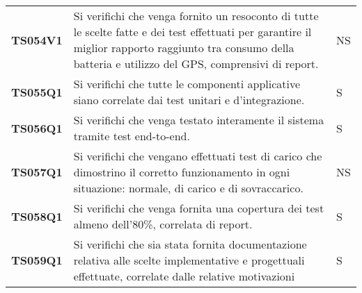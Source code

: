 \documentclass[../../piano-di-qualifica.tex]{subfiles}
\begin{document}
\begin{longtable}[H]{>{\centering\bfseries}m{3cm} >{}m{10cm} >{\centering\arraybackslash}m{3cm}}
  TS054V1            & Si verifichi che venga fornito un resoconto di tutte le scelte fatte e dei test effettuati per garantire il miglior rapporto raggiunto tra consumo della batteria e utilizzo del GPS, comprensivi di report.
                     & NS                                                                                                                                                                                                                                                  \\

  TS055Q1            & Si verifichi che tutte le componenti applicative siano correlate dai test unitari e d'integrazione.
                     & S                                                                                                                                                                                                                                                   \\

  TS056Q1            & Si verifichi che venga testato interamente il sistema tramite test end-to-end.
                     & S                                                                                                                                                                                                                                                   \\

  TS057Q1            & Si verifichi che vengano effettuati test di carico che dimostrino il corretto funzionamento in ogni situazione: normale, di carico e di sovraccarico.
                     & NS                                                                                                                                                                                                                                                  \\

  TS058Q1            & Si verifichi che venga fornita una copertura dei test almeno dell'80\%, correlata di report.
                     & S                                                                                                                                                                                                                                                   \\


  TS059Q1            & Si verifichi che sia stata fornita documentazione relativa alle scelte implementative e progettuali effettuate, correlate dalle relative motivazioni
                     & S                                                                                                                                                                                                                                                   \\


\end{longtable}
\end{document}
